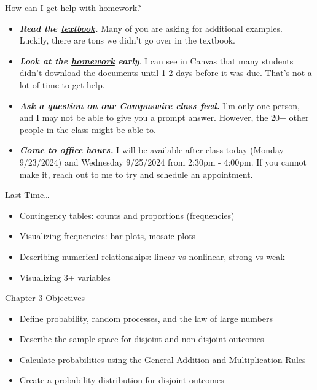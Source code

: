 \documentclass[
  ignorenonframetext,
]{beamer}
\begin{document}
\begin{frame}{How can I get help with homework?}
\label{how-can-i-get-help-with-homework}
\begin{itemize}
\item
  \textbf{\emph{Read the
  \href{https://canvas.jcu.edu/files/3669904/download?download_frd=1}{textbook}.}}
  Many of you are asking for additional examples. Luckily, there are
  tons we didn't go over in the textbook.
\item
  \textbf{\emph{Look at the
  \href{https://canvas.jcu.edu/courses/36290/assignments/451733}{homework}
  early}}. I can see in Canvas that many students didn't download the
  documents until 1-2 days before it was due. That's not a lot of time
  to get help.
\item
  \textbf{\emph{Ask a question on our
  \href{https://campuswire.com/c/G6427C531/feed}{Campuswire class
  feed}.}} I'm only one person, and I may not be able to give you a
  prompt answer. However, the 20+ other people in the class might be
  able to.
\item
  \textbf{\emph{Come to office hours.}} I will be available after class
  today (Monday 9/23/2024) and Wednesday 9/25/2024 from 2:30pm - 4:00pm.
  If you cannot make it, reach out to me to try and schedule an
  appointment.
\end{itemize}
\end{frame}

\begin{frame}{Last Time\ldots{}}
\label{last-time}
\begin{itemize}
\item
  Contingency tables: counts and proportions (frequencies)
\item
  Visualizing frequencies: bar plots, mosaic plots
\item
  Describing numerical relationships: linear vs nonlinear, strong vs
  weak
\item
  Visualizing 3+ variables
\end{itemize}
\end{frame}

\begin{frame}{Chapter 3 Objectives}
\label{chapter-3-objectives}
\begin{itemize}
\item
  Define probability, random processes, and the law of large numbers
\item
  Describe the sample space for disjoint and non-disjoint outcomes
\item
  Calculate probabilities using the General Addition and Multiplication
  Rules
\item
  Create a probability distribution for disjoint outcomes
\end{itemize}
\end{frame}
\end{document}
